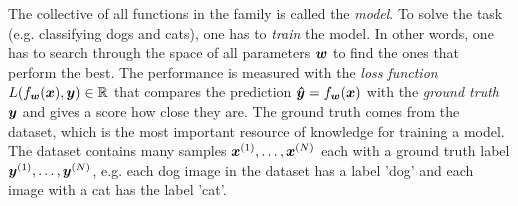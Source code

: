 		The collective of all functions in the family is called the \emph{model}.
		To solve the task (e.g. classifying dogs and cats), one has to \emph{train} the model.
		In other words, one has to search through the space of all parameters $\bm{w}$ to find the ones that perform the best.
		The performance is measured with the \emph{loss function} 
		$L(f_{\bm{w}}(\bm{x}), \bm{y}) \in \mathbb{R}$ that compares the prediction 
		$\bm{\hat{y}} = f_{\bm{w}}(\bm{x})$ with the \emph{ground truth} $\bm{y}$ and gives a score how close they are.
		The ground truth comes from the dataset, which is the most important resource of knowledge for training a model.
		The dataset contains many samples $\bm{x}^{(1)}, \dots, \bm{x}^{(N)}$ each with a ground truth label 
		$\bm{y}^{(1)}, \dots, \bm{y}^{(N)}$, e.g. each dog image in the dataset has a label 'dog' and each image with a cat has the label 'cat'.
		
